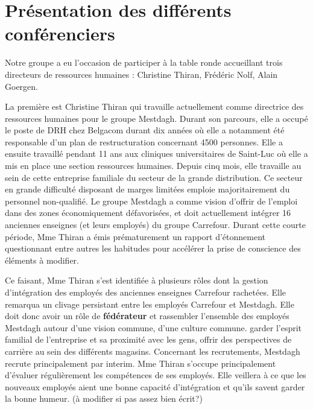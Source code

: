 \documentclass[a4paper, 12pt]{article}
\begin{document}


\section{Présentation des différents conférenciers}
Notre groupe a eu l'occasion de participer à la table ronde accueillant trois directeurs de ressources humaines : Christine Thiran, Frédéric Nolf, Alain Goergen. \newline

La première est Christine Thiran qui travaille actuellement comme directrice des ressources humaines pour le groupe Mestdagh. Durant son parcours, elle a occupé le poste de DRH chez Belgacom durant dix années  où elle a notamment été responsable d'un plan de restructuration concernant 4500 personnes.
Elle a ensuite travaillé pendant 11 ans aux cliniques universitaires de Saint-Luc où elle a mis en place une section ressources humaines.
Depuis cinq mois, elle travaille au sein de cette entreprise familiale du secteur de la grande distribution. Ce secteur en grande difficulté disposant de marges limitées emploie majoritairement du personnel non-qualifié. Le groupe Mestdagh a comme vision d'offrir de l'emploi dans des zones économiquement défavorisées, et doit actuellement intégrer 16 anciennes enseignes (et leurs employés) du groupe Carrefour.
Durant cette courte période, Mme Thiran a émis prématurement un rapport d'étonnement questionnant entre autres les habitudes pour accélérer la prise de conscience des éléments à modifier. \newline

Ce faisant, Mme Thiran s'est identifiée à plusieurs rôles dont la gestion d'intégration des employés des anciennes enseignes Carrefour rachetées. Elle remarqua un clivage persistant entre les employés Carrefour et Mestdagh. Elle doit donc avoir un rôle de \textbf{fédérateur} et rassembler l'ensemble des employés Mestdagh autour d'une vision commune, d'une culture commune.  garder l'esprit familial de l'entreprise et sa proximité avec les gens, offrir des perspectives de carrière au sein des différents magasins. Concernant les recrutements, Mestdagh recrute principalement par interim. Mme Thiran s'occupe principalement d'évaluer régulièrement les compétences de ses employés. Elle veillera à ce que les nouveaux employés aient une bonne capacité d'intégration et qu'ils savent garder la bonne humeur. (à modifier si pas assez bien écrit?)\newline
\end{document}

